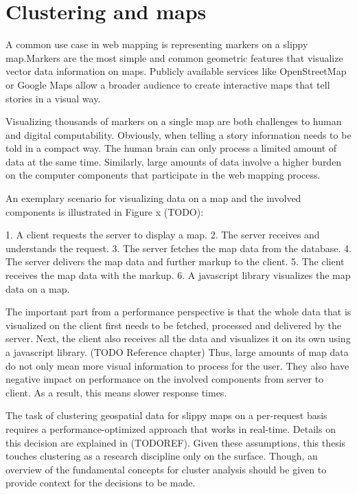 
%
%

\section{Clustering and maps}

A common use case in web mapping is representing markers on a slippy map.Markers are the most simple and common geometric features that visualize vector data information on maps. Publicly available services like OpenStreetMap or Google Maps allow a broader audience to create interactive maps that tell stories in a visual way.

Visualizing thousands of markers on a single map are both challenges to human and digital computability. Obviously, when telling a story information needs to be told in a compact way. The human brain can only process a limited amount of data at the same time. Similarly, large amounts of data involve a higher burden on the computer components that participate in the web mapping process.

An exemplary scenario for visualizing data on a map and the involved components is illustrated in Figure x (TODO):

1. A client requests the server to display a map.
2. The server receives and understands the request.
3. The server fetches the map data from the database.
4. The server delivers the map data and further markup to the client.
5. The client receives the map data with the markup.
6. A javascript library visualizes the map data on a map.

The important part from a performance perspective is that the whole data that is visualized on the client first needs to be fetched, processed and delivered by the server. Next, the client also receives all the data and visualizes it on its own using a javascript library. (TODO Reference chapter) Thus, large amounts of map data do not only mean more visual information to process for the user. They also have negative impact on performance on the involved components from server to client. As a result, this means slower response times. 

The task of clustering geospatial data for slippy maps on a per-request basis requires a performance-optimized approach that works in real-time. Details on this decision are explained in (TODOREF). Given these assumptions, this thesis touches clustering as a research discipline only on the surface. Though, an overview of the fundamental concepts for cluster analysis should be given to provide context for the decisions to be made.

